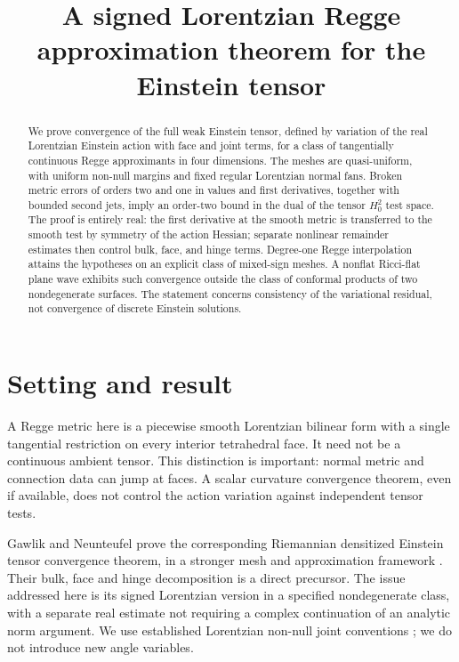 \documentclass[11pt]{article}
\title{A signed Lorentzian Regge approximation theorem for the Einstein tensor}
\author{}
\date{}
\begin{document}
\maketitle

\begin{abstract}
We prove convergence of the full weak Einstein tensor, defined by variation of the real Lorentzian Einstein action with face and joint terms, for a class of tangentially continuous Regge approximants in four dimensions. The meshes are quasi-uniform, with uniform non-null margins and fixed regular Lorentzian normal fans. Broken metric errors of orders two and one in values and first derivatives, together with bounded second jets, imply an order-two bound in the dual of the tensor \(H^2_0\) test space. The proof is entirely real: the first derivative at the smooth metric is transferred to the smooth test by symmetry of the action Hessian; separate nonlinear remainder estimates then control bulk, face, and hinge terms. Degree-one Regge interpolation attains the hypotheses on an explicit class of mixed-sign meshes. A nonflat Ricci-flat plane wave exhibits such convergence outside the class of conformal products of two nondegenerate surfaces. The statement concerns consistency of the variational residual, not convergence of discrete Einstein solutions.
\end{abstract}

\section{Setting and result}
A Regge metric here is a piecewise smooth Lorentzian bilinear form with a single tangential restriction on every interior tetrahedral face. It need not be a continuous ambient tensor. This distinction is important: normal metric and connection data can jump at faces. A scalar curvature convergence theorem, even if available, does not control the action variation against independent tensor tests.

Gawlik and Neunteufel prove the corresponding Riemannian densitized Einstein tensor convergence theorem, in a stronger mesh and approximation framework \cite{GN}. Their bulk, face and hinge decomposition is a direct precursor. The issue addressed here is its signed Lorentzian version in a specified nondegenerate class, with a separate real estimate not requiring a complex continuation of an analytic norm argument. We use established Lorentzian non-null joint conventions \cite{Hayward,Sorkin,Asante}; we do not introduce new angle variables.
\end{document}
